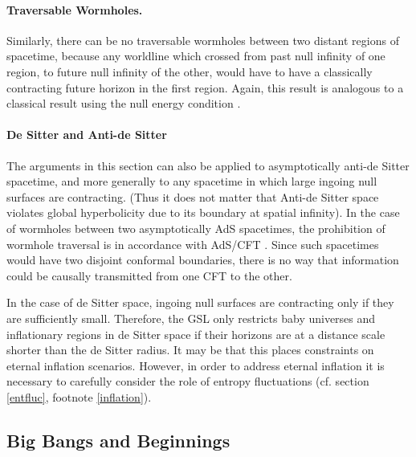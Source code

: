 \documentclass[12pt]{article}
\begin{document}
\paragraph{Traversable Wormholes.} Similarly, there can be no traversable wormholes between two distant regions of spacetime, because any worldline which crossed from past null infinity of one region, to future null infinity of the other, would have to have a classically contracting future horizon in the first region.  Again, this result is analogous to a classical result using the null energy condition \cite{worm}.

\paragraph{De Sitter and Anti-de Sitter} The arguments in this section can also be applied to asymptotically anti-de Sitter spacetime, and more generally to any spacetime in which large ingoing null surfaces are contracting.  (Thus it does not matter that Anti-de Sitter space violates global hyperbolicity due to its boundary at spatial infinity).  In the case of wormholes between two asymptotically AdS spacetimes, the prohibition of wormhole traversal is in accordance with AdS/CFT \cite{GSWW}.  Since such spacetimes would have two disjoint conformal boundaries, there is no way that information could be causally transmitted from one CFT to the other.

In the case of de Sitter space, ingoing null surfaces are contracting only if they are sufficiently small.  Therefore, the GSL only restricts baby universes and inflationary regions in de Sitter space if their horizons are at a distance scale shorter than the de Sitter radius.  It may be that this places constraints on eternal inflation scenarios.  However, in order to address eternal inflation it is necessary to carefully consider the role of entropy fluctuations (cf. section \ref{entfluc}, footnote \ref{inflation}).

\subsection{Big Bangs and Beginnings}\label{begin}
\end{document}
